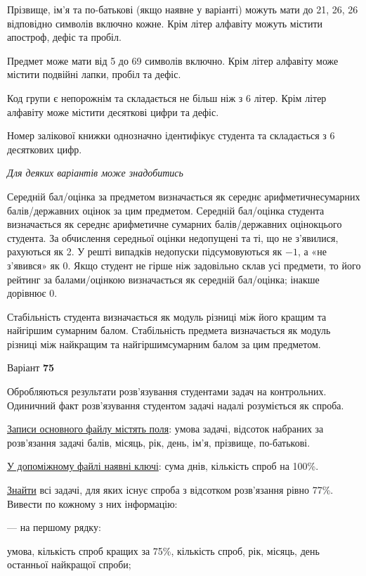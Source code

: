 \documentclass[11pt, ukrainian]{article}
\begin{document}
Прізвище, ім’я та по-батькові (якщо наявне у варіанті) можуть мати до 21, 26, 26 відповідно символів включно кожне. 
Крім літер алфавіту можуть містити апостроф, дефіс та пробіл.

Предмет може мати від 5 до 69 символів включно. 
Крім літер алфавіту може містити подвійні лапки, пробіл та дефіс.

Код групи є непорожнім та складається не більш ніж з 6 літер. 
Крім літер алфавіту може містити десяткові цифри та дефіс.


Номер залікової книжки однозначно ідентифікує студента та складається з 6 десяткових цифр. 

\bigskip\textit{Для деяких варіантів може знадобитись}

Середній бал/оцінка за предметом визначається як середнє арифметичнесумарних балів/державних оцінок за цим предметом. 
Середній бал/оцінка студента визначається як середнє арифметичне сумарних балів/державних оцінокцього студента. 
За обчислення середньої оцінки недопущені та ті, що не з’явилися, рахуються як 2.
У решті випадків недопуски підсумовуються як $-1$, а «не з’явився» як 0.
Якщо студент не гірше ніж задовільно склав усі предмети, 
то його рейтинг за балами/оцінкою визначається як середній бал/оцінка; інакше дорівнює 0.

Стабільність студента визначається як модуль різниці між його кращим та найгіршим сумарним балом.
Стабільність предмета визначається як модуль різниці між найкращим та найгіршимсумарним балом за цим предметом.






\par
\newpage
{\center Варіант  \No \textbf { 75 }\par}
\bigskip
Обробляються результати розв’язування студентами задач на контрольних.
Одиничний факт роз\-в’я\-зу\-вання студентом задачі надалі розуміється як спроба.

\underline{Записи основного файлу містять поля}: умова задачі, відсоток набраних за розв’язання задачі балів, місяць, рік, день, ім’я, прізвище, по-батькові.

\underline{У допоміжному файлі наявні ключі}: сума днів, кількість спроб на 100\%.

\underline{Знайти} всі задачі, для яких існує спроба з відсотком розв’язання рівно 77\%. Вивести по кожному з них інформацію:\par
{\noindent}--- на першому рядку:\par
умова, кількість спроб кращих за 75\%, кількість спроб, рік, місяць, день останньої найкращої спроби;
\end{document}
